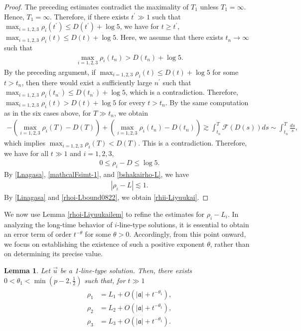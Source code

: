 \documentclass[reqno]{amsart}
\theoremstyle{plain}
\newtheorem{lemma}[theorem]{Lemma}
\theoremstyle{definition}
\numberwithin{equation}{section}
\begin{document}
\begin{proof}
The preceding estimates contradict the maximality of $T_1$ unless $T_1=\infty$. Hence, $T_1=\infty$. Therefore, if there exists $t^{\prime}\gg 1$ such that $\max_{i=1,2,3}\rho_i(t^{\prime})\leq D(t^{\prime})+\log{5}$, we have for $t\geq t^{\prime}$, $\max_{i=1,2,3}\rho_i(t)\leq D(t)+\log{5}$. Here, we assume that there exists $t_n\to\infty$ such that 
\begin{align*}
\max_{i=1,2,3}\rho_i(t_n)>D(t_n)+\log{5}.
\end{align*}
By the preceding argument, if $\max_{i=1,2,3}\rho_i(t)\leq D(t)+\log{5}$ for some $t>t_n$, then there would exist a sufficiently large $n^{\prime}$ such that $\max_{i=1,2,3}\rho_i(t_{n^{\prime}})\leq D(t_{n^{\prime}})+\log{5}$, which is a contradiction. Therefore, $\max_{i=1,2,3}\rho_i(t)>D(t)+\log{5}$ for every $t>t_n$. By the same computation as in the six cases above, for $T\gg t_n$, we obtain
\begin{align*}
-\left(\max_{i=1,2,3}\rho_i(T)-D(T)\right)+\left(\max_{i=1,2,3}\rho_i(t_n)-D(t_n)\right)\gtrsim \int_{t_n}^T\mathcal{F}(D(s))ds\sim \int_{t_n}^T\frac{ds}{s},
\end{align*}
which implies $\max_{i=1,2,3}\rho_i(T)<D(T)$. This is a contradiction. Therefore, we have for all $t\gg 1$ and $i=1,2,3$,
\begin{align}\label{bshakairho-L}
0\leq \rho_i-D\leq \log{5}.
\end{align}
By \eqref{Lnagasa}, \eqref{mathcalFsimt-1}, and \eqref{bshakairho-L}, we have 
\begin{align}\label{rhoi-Lbound0822}
|\rho_i-L|\lesssim 1.
\end{align}
By \eqref{Linagasa} and \eqref{rhoi-Lbound0822}, we obtain \eqref{rhii-Liyuukai}.
\end{proof}
We now use Lemma \ref{rhoi-Liyuukailem} to refine the estimates for $\rho_i-L_i$. In analyzing the long-time behavior of $i$-line-type solutions, it is essential to obtain an error term of order $t^{-\theta}$ for some $\theta>0$. Accordingly, from this point onward, we focus on establishing the existence of such a positive exponent $\theta$, rather than on determining its precise value.
\begin{lemma}\label{rhoinagasalem}
Let $\vec{u}$ be a 1-line-type solution. Then, there exists $0<\theta_1<\min{(p-2,\frac{1}{2})}$ such that, for $t\gg 1$
\begin{align}\label{rhoinagasalemes}
\begin{aligned}
\rho_1&=L_1+O\left(|\mathfrak{a}|+t^{-\theta_1}\right),
\\
\rho_2&=L_2+O\left(|\mathfrak{a}|+t^{-\theta_1}\right),
\\
\rho_3&=L_3+O\left(|\mathfrak{a}|+t^{-\theta_1}\right).
\end{aligned}
\end{align}
\end{lemma}
\end{document}
